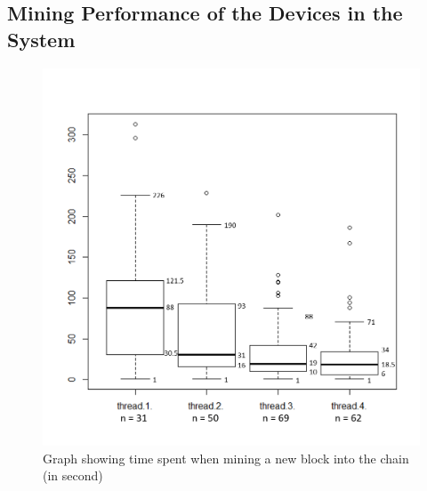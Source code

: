 \subsection*{Mining Performance of the Devices in the System}

\begin{figure}[htb!]
  \centering
  \includegraphics[width=\textwidth]{images/ExperimentMining.png}
  \caption{Graph showing time spent when mining a new block into the chain (in second)}
  \label{fig:ExperimentMining}
\end{figure}

